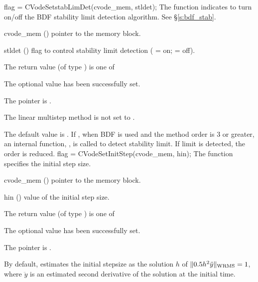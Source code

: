 {
flag = CVodeSetstabLimDet(cvode\_mem, stldet);
}
{
  The function  indicates to turn on/off
  the BDF stability limit detection algorithm. See \S\ref{s:bdf_stab}.
}
{
  \begin{args}
  \item[cvode\_mem] ()
    pointer to the {\cvode} memory block.
  \item[stldet] ()
    flag to control stability limit detection ( = on;  = off).
  \end{args}
}
{
  The return value  (of type ) is one of
  \begin{args}
  \item[\Id{CV\_SUCCESS}] 
    The optional value has been successfully set.
  \item[\Id{CV\_MEM\_NULL}]
    The  pointer is .
  \item[\Id{CV\_ILL\_INPUT}]
    The linear multistep method is not set to .
  \end{args}
}
{
  The default value is . If , when BDF is used
  and the method order is 3 or greater, an internal function, ,
  is called to detect stability limit. If limit is detected, the order is reduced.
}
{
flag = CVodeSetInitStep(cvode\_mem, hin);
}
{
  The function  specifies the initial step size.
}
{
  \begin{args}
  \item[cvode\_mem] ()
    pointer to the {\cvode} memory block.
  \item[hin] ()
    value of the initial step size.
  \end{args}
}
{
  The return value  (of type ) is one of
  \begin{args}
  \item[\Id{CV\_SUCCESS}] 
    The optional value has been successfully set.
  \item[\Id{CV\_MEM\_NULL}]
    The  pointer is .
  \end{args}
}
{
  By default, {\cvode} estimates the initial stepsize as the solution $h$ 
  of $\| 0.5 h^2 \ddot y \|_{\mbox{\scriptsize WRMS}} = 1$,
  where $\ddot y$ is an estimated second derivative of the solution at the
  initial time.
}
